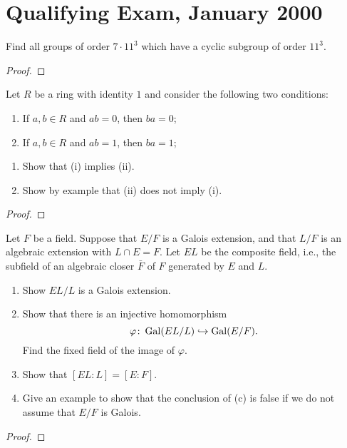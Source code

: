 \chapter{Qualifying Exam, January 2000}
\begin{problem}
Find all groups of order $7\cdot 11^3$ which have a cyclic subgroup of
order $11^3$.
\end{problem}
\begin{proof}
\end{proof}

\begin{problem}
Let $R$ be a ring with identity $1$ and consider the following two
conditions:
\begin{center}
\begin{enumerate}[label=(\roman*)]
\item If $a,b\in R$ and $ab=0$, then $ba=0$;
\item If $a,b\in R$ and $ab=1$, then $ba=1$;
\end{enumerate}
\end{center}
\begin{enumerate}[label=(\alph*)]
\item Show that (i) implies (ii).
\item Show by example that (ii) does not imply (i).
\end{enumerate}
\end{problem}
\begin{proof}
\end{proof}

\begin{problem}
Let $F$ be a field. Suppose that $E/F$ is a Galois extension, and that
$L/F$ is an algebraic extension with $L\cap E=F$. Let $EL$ be the composite
field, i.e., the subfield of an algebraic closer $\bar F$ of $F$ generated
by $E$ and $L$.
\begin{enumerate}[label=(\alph*)]
\item Show $EL/L$ is a Galois extension.
\item Show that there is an injective homomorphism
\[\varphi\colon\operatorname{Gal}(EL/L)\hookrightarrow\operatorname{Gal}(E/F).\]
Find the fixed field of the image of $\varphi$.
\item Show that $[EL:L]=[E:F]$.
\item Give an example to show that the conclusion of (c) is false if we do
  not assume that $E/F$ is Galois.
\end{enumerate}
\end{problem}
\begin{proof}
\end{proof}

